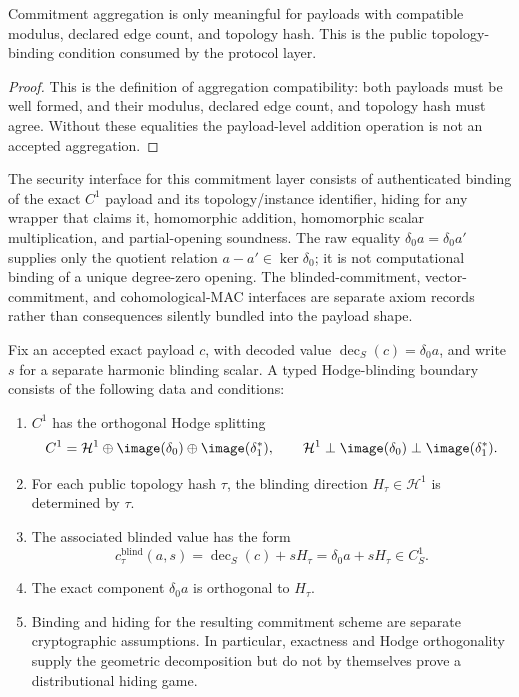 \begin{proposition}\label{prop:topology-compatible-aggregation}
  Commitment aggregation is only meaningful for payloads with compatible
  modulus, declared edge count, and topology hash. This is the public
  topology-binding condition consumed by the protocol layer.
\end{proposition}

\begin{proof}
  This is the definition of aggregation compatibility: both payloads must be
  well formed, and their modulus, declared edge count, and topology hash must
  agree. Without these equalities the payload-level addition operation is not
  an accepted aggregation.
\end{proof}

The security interface for this commitment layer consists of authenticated
binding of the exact \(C^1\) payload and its topology/instance identifier,
hiding for any wrapper that claims it, homomorphic addition, homomorphic scalar
multiplication, and partial-opening soundness. The raw equality
\(\delta_0a=\delta_0a'\) supplies only the quotient relation
\(a-a'\in\ker\delta_0\); it is not computational binding of a unique
degree-zero opening. The blinded-commitment, vector-commitment, and
cohomological-MAC interfaces are separate axiom records rather than consequences
silently bundled into the payload shape.

\begin{definition}\label{def:blinded-commitment-boundary}
  Fix an accepted exact payload \(c\), with decoded value
  \(\operatorname{dec}_S(c)=\delta_0a\), and write \(s\) for a separate
  harmonic blinding scalar. A typed Hodge-blinding boundary consists of the
  following data and conditions:
  \begin{enumerate}[label=(\roman*)]
    \item \(C^1\) has the orthogonal Hodge splitting
      \[
        C^1
        =
        \mathcal H^1\oplus\image(\delta_0)\oplus\image(\delta_1^\ast),
        \qquad
        \mathcal H^1\perp\image(\delta_0)\perp\image(\delta_1^\ast).
      \]
    \item For each public topology hash \(\tau\), the blinding direction
      \(H_\tau\in\mathcal H^1\) is determined by \(\tau\).
    \item The associated blinded value has the form
      \[
        c^{\mathrm{blind}}_\tau(a,s)
        =\operatorname{dec}_S(c)+sH_\tau
        =\delta_0a+sH_\tau\in C_S^1 .
      \]
    \item The exact component \(\delta_0a\) is orthogonal to \(H_\tau\).
    \item Binding and hiding for the resulting commitment scheme are separate
      cryptographic assumptions. In particular, exactness and Hodge
      orthogonality supply the geometric decomposition but do not by
      themselves prove a distributional hiding game.
  \end{enumerate}
\end{definition}

